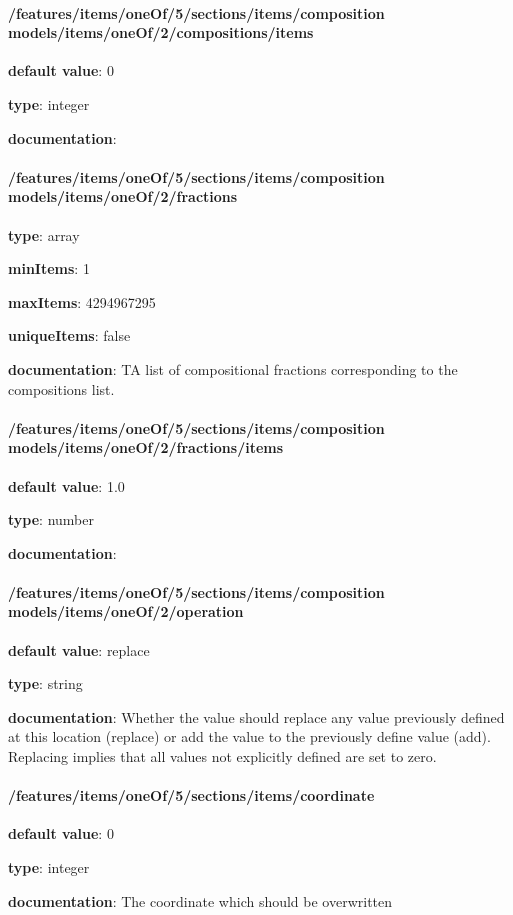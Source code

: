 \begin{itemized}
\paragraph{/features/items/oneOf/5/sections/items/composition models/items/oneOf/2/compositions/items} \begin{itemized}
\item {\bf default value}: 0
\item {\bf type}: integer
\item {\bf documentation}: 
\end{itemized}\end{itemized}\paragraph{/features/items/oneOf/5/sections/items/composition models/items/oneOf/2/fractions} \begin{itemized}
\item {\bf type}: array
\item {\bf minItems}: 1
\item {\bf maxItems}: 4294967295
\item {\bf uniqueItems}: false
\item {\bf documentation}: TA list of compositional fractions corresponding to the compositions list.
\paragraph{/features/items/oneOf/5/sections/items/composition models/items/oneOf/2/fractions/items} \begin{itemized}
\item {\bf default value}: 1.0
\item {\bf type}: number
\item {\bf documentation}: 
\end{itemized}\end{itemized}\paragraph{/features/items/oneOf/5/sections/items/composition models/items/oneOf/2/operation} \begin{itemized}
\item {\bf default value}: replace
\item {\bf type}: string
\item {\bf documentation}: Whether the value should replace any value previously defined at this location (replace) or add the value to the previously define value (add). Replacing implies that all values not explicitly defined are set to zero.
\end{itemized}\paragraph{/features/items/oneOf/5/sections/items/coordinate} \begin{itemized}
\item {\bf default value}: 0
\item {\bf type}: integer
\item {\bf documentation}: The coordinate which should be overwritten
\end{itemized}